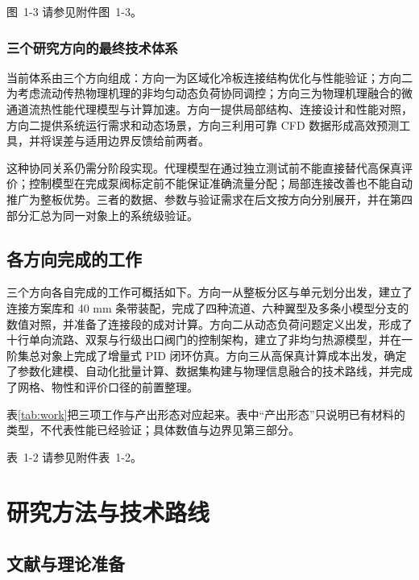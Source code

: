 \documentclass[UTF8]{midterm}
\makeatletter
\newcommand{\submissionnumber}[1]{\def\@currentlabel{#1}}
\makeatother
\begin{document}
\par\noindent \begingroup\submissionnumber{1-3}\label{fig:03}\endgroup 图~1-3 请参见附件图~1-3。\par


\subsubsection{三个研究方向的最终技术体系}
当前体系由三个方向组成：方向一为区域化冷板连接结构优化与性能验证；方向二为考虑流动传热物理机理的非均匀动态负荷协同调控；方向三为物理机理融合的微通道流热性能代理模型与计算加速。方向一提供局部结构、连接设计和性能对照，方向二提供系统运行需求和动态场景，方向三利用可靠 CFD 数据形成高效预测工具，并将误差与适用边界反馈给前两者。

这种协同关系仍需分阶段实现。代理模型在通过独立测试前不能直接替代高保真评价；控制模型在完成泵阀标定前不能保证准确流量分配；局部连接改善也不能自动推广为整板优势。三者的数据、参数与验证需求在后文按方向分别展开，并在第四部分汇总为同一对象上的系统级验证。



\subsection{各方向完成的工作}

三个方向各自完成的工作可概括如下。方向一从整板分区与单元划分出发，建立了连接方案库和 40 mm 条带装配，完成了四种流道、六种翼型及多条小模型分支的数值对照，并准备了连接段的成对计算。方向二从动态负荷问题定义出发，形成了十行单向流路、双泵与行级出口阀门的控制架构，建立了非均匀热源模型，并在一阶集总对象上完成了增量式 PID 闭环仿真。方向三从高保真计算成本出发，确定了参数化建模、自动化批量计算、数据集构建与物理信息融合的技术路线，并完成了网格、物性和评价口径的前置整理。

表\ref{tab:work}把三项工作与产出形态对应起来。表中“产出形态”只说明已有材料的类型，不代表性能已经验证；具体数值与边界见第三部分。

\par\noindent \begingroup\submissionnumber{1-2}\label{tab:work}\endgroup 表~1-2 请参见附件表~1-2。\par


\section{研究方法与技术路线}

\subsection{文献与理论准备}
\end{document}
